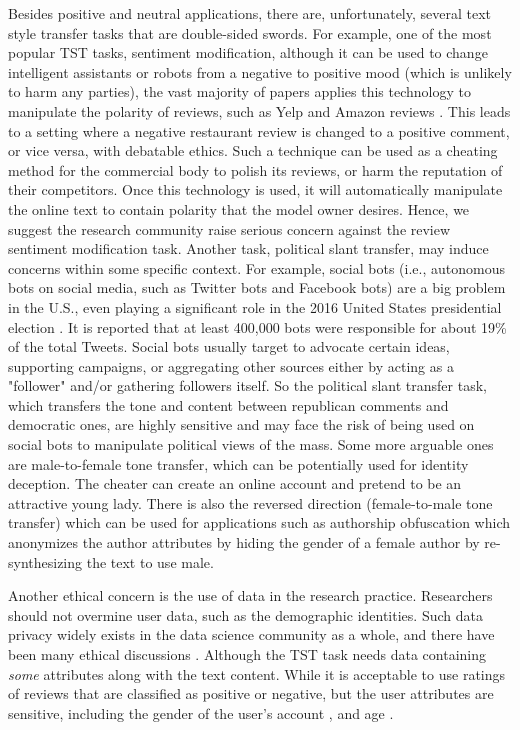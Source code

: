 Besides positive and neutral applications, there are, unfortunately, several text style transfer tasks that are double-sided swords.
For example, one of the most popular TST tasks, sentiment modification, although it can be used to change intelligent assistants or robots from a negative to positive mood (which is unlikely to harm any parties), the vast majority of papers applies this technology to manipulate the polarity of reviews, such as Yelp  and Amazon reviews .
This leads to a setting where a negative restaurant review is changed to a positive comment, or vice versa, with debatable ethics. Such a technique can be used
as a cheating method for the commercial body to polish its reviews, or harm the reputation of their competitors. Once this technology is used, it will automatically manipulate the online text to contain polarity that the model owner desires. Hence, we suggest the research community raise serious concern against the review sentiment modification task.
Another task, political slant transfer, may induce concerns within some specific context. For example, social bots (i.e., autonomous bots on social media, such as Twitter bots and Facebook bots) are a big problem in the U.S., even playing a significant role in the 2016 United States presidential election .
It is reported that at least 400,000 bots were responsible for about 19\% of the total Tweets. Social bots usually target to advocate certain ideas, supporting campaigns, or aggregating other sources either by acting as a "follower" and/or gathering followers itself. So the political slant transfer task, which transfers the tone and content between republican comments and democratic ones, are highly sensitive and may face the risk of being used on social bots to manipulate political views of the mass.
Some more arguable ones are male-to-female tone transfer, which can be potentially used for identity deception. The cheater can create an online account and pretend to be an attractive young lady. There is also the reversed direction (female-to-male tone transfer) which can be used for applications  such as authorship obfuscation  which anonymizes the author attributes by hiding the gender of a female author by re-synthesizing the text to use male.

Another ethical concern is the use of data in the research practice. Researchers should not overmine user data, such as the demographic identities. Such data privacy widely exists in the data science community as a whole, and there have been many ethical discussions .
Although the TST task needs data containing \textit{some} attributes along with the text content. While it is acceptable to use ratings of reviews that are classified as positive or negative, but the user attributes are sensitive, including the gender of the user's account , and age . 

